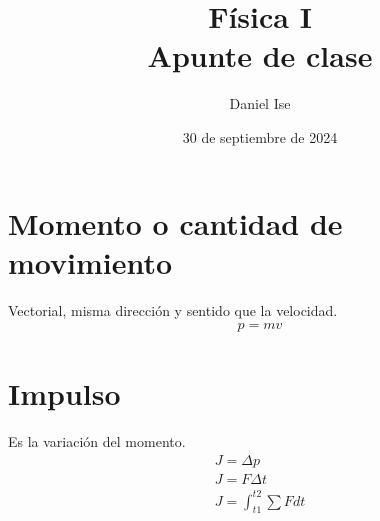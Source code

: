 \documentclass[12pt]{article}
\title{Física I\\Apunte de clase}
\author{Daniel Ise}
\date{30 de septiembre de 2024}
\begin{document}
\maketitle

\tableofcontents

\section{Momento o cantidad de movimiento}

Vectorial, misma dirección y sentido que la velocidad.
\begin{align*}
    p = mv
\end{align*}

\section{Impulso}

Es la variación del momento.
\begin{align*}
    J = \Delta p \\
    J = F \Delta t \\
    J = \int_{t1}^{t2} \sum F dt
\end{align*}
\end{document}
